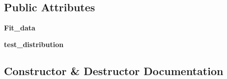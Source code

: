 \subsection*{Public Attributes}
\begin{DoxyCompactItemize}
\item 
{\bfseries Fit\+\_\+data}\hypertarget{classSAD_1_1Point__AnomalyDetector_1_1PyiscAnomalyScorer__advanced_1_1PyiscAnomalyScorer__advanced_a562d1e9828fbdc6a95436452dddbc3b8}{}\label{classSAD_1_1Point__AnomalyDetector_1_1PyiscAnomalyScorer__advanced_1_1PyiscAnomalyScorer__advanced_a562d1e9828fbdc6a95436452dddbc3b8}

\item 
{\bfseries test\+\_\+distribution}\hypertarget{classSAD_1_1Point__AnomalyDetector_1_1PyiscAnomalyScorer__advanced_1_1PyiscAnomalyScorer__advanced_aaefabc087f5917aa7426745c93e4f5cb}{}\label{classSAD_1_1Point__AnomalyDetector_1_1PyiscAnomalyScorer__advanced_1_1PyiscAnomalyScorer__advanced_aaefabc087f5917aa7426745c93e4f5cb}

\end{DoxyCompactItemize}


\subsection{Constructor \& Destructor Documentation}
